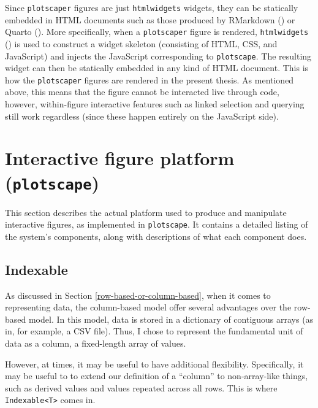 \documentclass[
]{book}
\theoremstyle{definition}
\theoremstyle{definition}
\theoremstyle{definition}
\theoremstyle{definition}
\theoremstyle{remark}
\begin{document}
Since \texttt{plotscaper} figures are just \texttt{htmlwidgets} widgets, they can be statically embedded in HTML documents such as those produced by RMarkdown () or Quarto (). More specifically, when a \texttt{plotscaper} figure is rendered, \texttt{htmlwidgets} () is used to construct a widget skeleton (consisting of HTML, CSS, and JavaScript) and injects the JavaScript corresponding to \texttt{plotscape}. The resulting widget can then be statically embedded in any kind of HTML document. This is how the \texttt{plotscaper} figures are rendered in the present thesis. As mentioned above, this means that the figure cannot be interacted live through code, however, within-figure interactive features such as linked selection and querying still work regardless (since these happen entirely on the JavaScript side).

\section{\texorpdfstring{Interactive figure platform (\texttt{plotscape})}{Interactive figure platform (plotscape)}}\label{interactive-figure-platform-plotscape}

This section describes the actual platform used to produce and manipulate interactive figures, as implemented in \texttt{plotscape}. It contains a detailed listing of the system's components, along with descriptions of what each component does.

\subsection{Indexable}\label{Indexable}

As discussed in Section \ref{row-based-or-column-based}, when it comes to representing data, the column-based model offer several advantages over the row-based model. In this model, data is stored in a dictionary of contiguous arrays (as in, for example, a CSV file). Thus, I chose to represent the fundamental unit of data as a column, a fixed-length array of values.

However, at times, it may be useful to have additional flexibility. Specifically, it may be useful to to extend our definition of a ``column'' to non-array-like things, such as derived values and values repeated across all rows. This is where \texttt{Indexable\textless{}T\textgreater{}} comes in.
\end{document}
